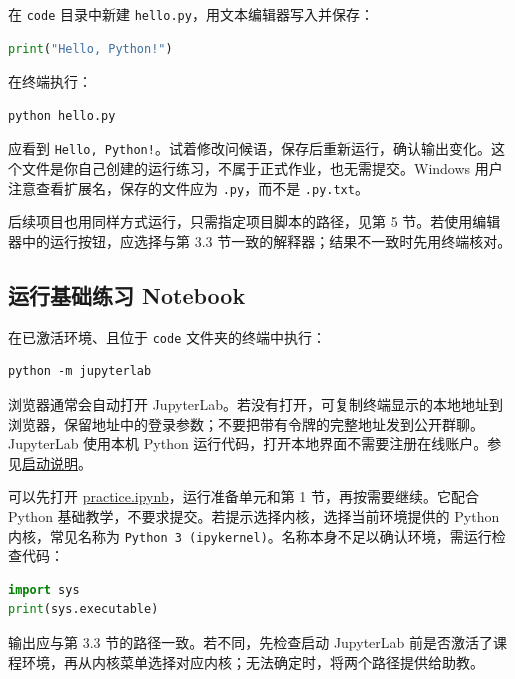 \documentclass[UTF8,a4paper,11pt,fontset=fandol]{ctexart}
\providecommand{\passthrough}[1]{#1}
\begin{document}
在 \passthrough{\lstinline!code!} 目录中新建 \passthrough{\lstinline!hello.py!}，用文本编辑器写入并保存：

\begin{lstlisting}[language=Python]
print("Hello, Python!")
\end{lstlisting}

在终端执行：

\begin{lstlisting}[language={}]
python hello.py
\end{lstlisting}

应看到 \passthrough{\lstinline"Hello, Python!"}。试着修改问候语，保存后重新运行，确认输出变化。这个文件是你自己创建的运行练习，不属于正式作业，也无需提交。Windows 用户注意查看扩展名，保存的文件应为 \passthrough{\lstinline!.py!}，而不是 \passthrough{\lstinline!.py.txt!}。

后续项目也用同样方式运行，只需指定项目脚本的路径，见第 5 节。若使用编辑器中的运行按钮，应选择与第 3.3 节一致的解释器；结果不一致时先用终端核对。

\subsection{运行基础练习 Notebook}\label{ux8fd0ux884cux57faux7840ux7ec3ux4e60-notebook}

在已激活环境、且位于 \passthrough{\lstinline!code!} 文件夹的终端中执行：

\begin{lstlisting}[language={}]
python -m jupyterlab
\end{lstlisting}

浏览器通常会自动打开 JupyterLab。若没有打开，可复制终端显示的本地地址到浏览器，保留地址中的登录参数；不要把带有令牌的完整地址发到公开群聊。JupyterLab 使用本机 Python 运行代码，打开本地界面不需要注册在线账户。参见\href{https://jupyterlab.readthedocs.io/en/stable/getting_started/starting.html}{启动说明}。

可以先打开 \href{code/practice.ipynb}{practice.ipynb}，运行准备单元和第 1 节，再按需要继续。它配合 Python 基础教学，不要求提交。若提示选择内核，选择当前环境提供的 Python 内核，常见名称为 \passthrough{\lstinline!Python 3 (ipykernel)!}。名称本身不足以确认环境，需运行检查代码：

\begin{lstlisting}[language=Python]
import sys
print(sys.executable)
\end{lstlisting}

输出应与第 3.3 节的路径一致。若不同，先检查启动 JupyterLab 前是否激活了课程环境，再从内核菜单选择对应内核；无法确定时，将两个路径提供给助教。
\end{document}
